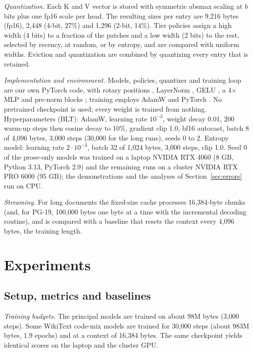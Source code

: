 \documentclass[10pt,twocolumn]{extarticle}
\begin{document}
\textit{Quantization.} Each K and V vector is stored with symmetric absmax scaling at $b$ bits plus one fp16 scale per head. The resulting sizes per entry are 9,216 bytes (fp16), 2,448 (4-bit, 27\%) and 1,296 (2-bit, 14\%). Tier policies assign a high width (4 bits) to a fraction of the patches and a low width (2 bits) to the rest, selected by recency, at random, or by entropy, and are compared with uniform widths. Eviction and quantization are combined by quantizing every entry that is retained.

\textit{Implementation and environment.} Models, policies, quantizer and training loop are our own PyTorch code, with rotary positions \citep{su2021roformer}, LayerNorm \citep{ba2016layernorm}, GELU \citep{hendrycks2016gelu}, a 4$\times$ MLP and pre-norm blocks \citep{vaswani2017attention}; training employs AdamW \citep{loshchilov2019adamw} and PyTorch \citep{paszke2019pytorch}. No pretrained checkpoint is used; every weight is trained from nothing. Hyperparameters (BLT): AdamW, learning rate $10^{-3}$, weight decay 0.01, 200 warm-up steps then cosine decay to 10\%, gradient clip 1.0, bf16 autocast, batch 8 of 4,096 bytes, 3,000 steps (30,000 for the long runs), seeds 0 to 2. Entropy model: learning rate $2\cdot10^{-3}$, batch 32 of 1,024 bytes, 3,000 steps, clip 1.0. Seed 0 of the prose-only models was trained on a laptop NVIDIA RTX 4060 (8 GB, Python 3.13, PyTorch 2.9) and the remaining runs on a cluster NVIDIA RTX PRO 6000 (95 GB); the demonstrations and the analyses of Section~\ref{sec:errors} run on CPU.

\textit{Streaming.} For long documents the fixed-size cache processes 16,384-byte chunks (and, for PG-19, 100,000 bytes one byte at a time with the incremental decoding routine), and is compared with a baseline that resets the context every 4,096 bytes, the training length.

\section{Experiments}\label{sec:exp}
\subsection{Setup, metrics and baselines}
\textit{Training budgets.} The principal models are trained on about 98M bytes (3,000 steps). Some WikiText code-mix models are trained for 30,000 steps (about 983M bytes, 1.9 epochs) and at a context of 16,384 bytes. The same checkpoint yields identical scores on the laptop and the cluster GPU.
\end{document}

